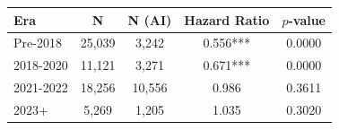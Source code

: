 \begin{tabular}{lcccc}
\toprule
\textbf{Era} & \textbf{N} & \textbf{N (AI)} & \textbf{Hazard Ratio} & \textbf{$p$-value} \\
\midrule
Pre-2018 & 25,039 & 3,242 & 0.556*** & 0.0000 \\
2018-2020 & 11,121 & 3,271 & 0.671*** & 0.0000 \\
2021-2022 & 18,256 & 10,556 & 0.986 & 0.3611 \\
2023+ & 5,269 & 1,205 & 1.035 & 0.3020 \\
\bottomrule
\end{tabular}